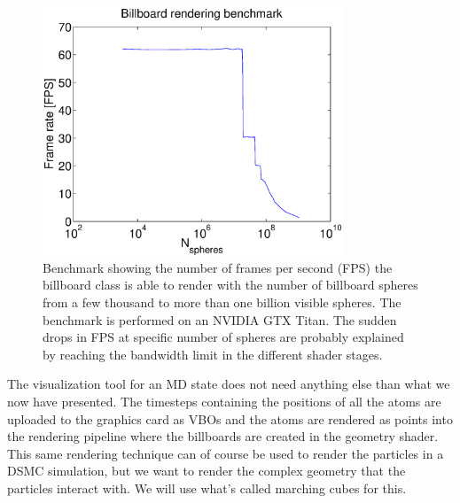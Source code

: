 \begin{figure}[htb]
\begin{center}
\includegraphics[width=0.8\textwidth, trim=0cm 0cm 0cm 0cm, clip]{visualization/figures/benchmark.eps}
\end{center}
\caption{Benchmark showing the number of frames per second (FPS) the billboard class is able to render with the number of billboard spheres from a few thousand to more than one billion visible spheres. The benchmark is performed on an NVIDIA GTX Titan. The sudden drops in FPS at specific number of spheres are probably explained by reaching the bandwidth limit in the different shader stages.}
\label{fig:rendering_benchmark}
\end{figure}
The visualization tool for an MD state does not need anything else than what we now have presented. The timesteps containing the positions of all the atoms are uploaded to the graphics card as VBOs and the atoms are rendered as points into the rendering pipeline where the billboards are created in the geometry shader. This same rendering technique can of course be used to render the particles in a DSMC simulation, but we want to render the complex geometry that the particles interact with. We will use what's called marching cubes for this.